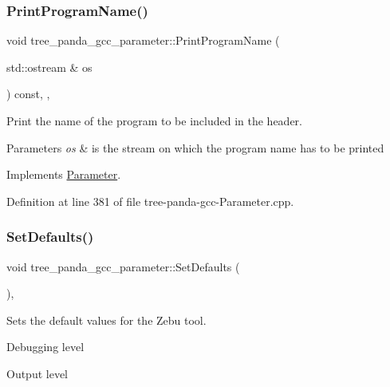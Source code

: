 \subsubsection{\texorpdfstring{Print\+Program\+Name()}{PrintProgramName()}}
{\footnotesize\ttfamily void tree\+\_\+panda\+\_\+gcc\+\_\+parameter\+::\+Print\+Program\+Name (\begin{DoxyParamCaption}\item[{std\+::ostream \&}]{os }\end{DoxyParamCaption}) const\hspace{0.3cm}{\ttfamily [override]}, {\ttfamily [private]}, {\ttfamily [virtual]}}



Print the name of the program to be included in the header. 


\begin{DoxyParams}{Parameters}
{\em os} & is the stream on which the program name has to be printed \\
\hline
\end{DoxyParams}


Implements \hyperlink{classParameter_afe71fca464da99b2ff720d3ad15df051}{Parameter}.



Definition at line 381 of file tree-\/panda-\/gcc-\/\+Parameter.\+cpp.

\mbox{\label{classtree__panda__gcc__parameter_a2064bc94ae2751a0e420a60e2024fcbc}} 
\subsubsection{\texorpdfstring{Set\+Defaults()}{SetDefaults()}}
{\footnotesize\ttfamily void tree\+\_\+panda\+\_\+gcc\+\_\+parameter\+::\+Set\+Defaults (\begin{DoxyParamCaption}{ }\end{DoxyParamCaption})\hspace{0.3cm}{\ttfamily [override]}, {\ttfamily [virtual]}}



Sets the default values for the Zebu tool. 

Debugging level

Output level

